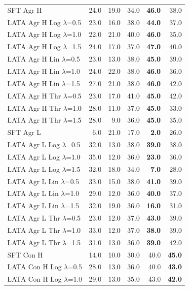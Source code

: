 \begin{longtable}{lrrrrr}
SFT Agr H & 24.0 & 19.0 & 34.0 & \textbf{46.0} & 38.0 \\
LATA Agr H Log $\lambda$=0.5 & 23.0 & 16.0 & 38.0 & \textbf{44.0} & 37.0 \\
LATA Agr H Log $\lambda$=1.0 & 22.0 & 21.0 & 40.0 & \textbf{46.0} & 35.0 \\
LATA Agr H Log $\lambda$=1.5 & 24.0 & 17.0 & 37.0 & \textbf{47.0} & 40.0 \\
LATA Agr H Lin $\lambda$=0.5 & 23.0 & 13.0 & 38.0 & \textbf{45.0} & 39.0 \\
LATA Agr H Lin $\lambda$=1.0 & 24.0 & 22.0 & 38.0 & \textbf{46.0} & 36.0 \\
LATA Agr H Lin $\lambda$=1.5 & 27.0 & 21.0 & 38.0 & \textbf{46.0} & 42.0 \\
LATA Agr H Thr $\lambda$=0.5 & 23.0 & 17.0 & 41.0 & \textbf{45.0} & 42.0 \\
LATA Agr H Thr $\lambda$=1.0 & 28.0 & 11.0 & 37.0 & \textbf{45.0} & 33.0 \\
LATA Agr H Thr $\lambda$=1.5 & 28.0 & 9.0 & 36.0 & \textbf{45.0} & 35.0 \\
SFT Agr L & 6.0 & 21.0 & 17.0 & \textbf{2.0} & 26.0 \\
LATA Agr L Log $\lambda$=0.5 & 32.0 & 13.0 & 38.0 & \textbf{39.0} & 38.0 \\
LATA Agr L Log $\lambda$=1.0 & 35.0 & 12.0 & 36.0 & \textbf{23.0} & 36.0 \\
LATA Agr L Log $\lambda$=1.5 & 32.0 & 18.0 & 34.0 & \textbf{7.0} & 28.0 \\
LATA Agr L Lin $\lambda$=0.5 & 33.0 & 15.0 & 38.0 & \textbf{41.0} & 39.0 \\
LATA Agr L Lin $\lambda$=1.0 & 29.0 & 12.0 & 36.0 & \textbf{40.0} & 37.0 \\
LATA Agr L Lin $\lambda$=1.5 & 32.0 & 19.0 & 36.0 & \textbf{16.0} & 31.0 \\
LATA Agr L Thr $\lambda$=0.5 & 23.0 & 12.0 & 37.0 & \textbf{43.0} & 39.0 \\
LATA Agr L Thr $\lambda$=1.0 & 33.0 & 12.0 & 37.0 & \textbf{38.0} & 39.0 \\
LATA Agr L Thr $\lambda$=1.5 & 31.0 & 13.0 & 36.0 & \textbf{39.0} & 42.0 \\
SFT Con H & 14.0 & 10.0 & 30.0 & 40.0 & \textbf{45.0} \\
LATA Con H Log $\lambda$=0.5 & 28.0 & 13.0 & 36.0 & 40.0 & \textbf{43.0} \\
LATA Con H Log $\lambda$=1.0 & 29.0 & 13.0 & 35.0 & 43.0 & \textbf{42.0} \\

\end{longtable}
